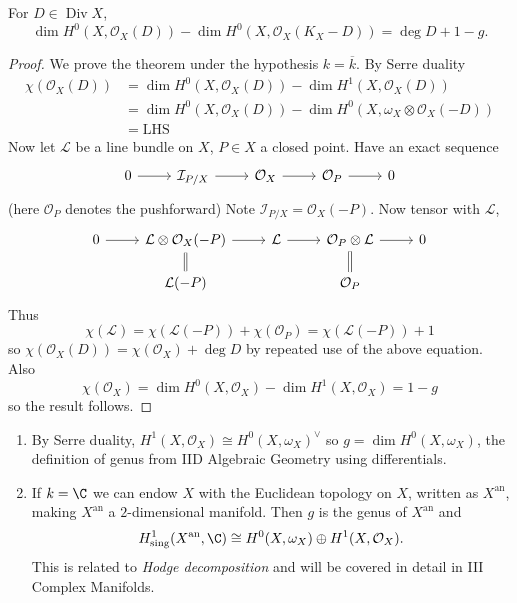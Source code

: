 \documentclass[a4paper]{article}
\newcommand{\sh}[1]{\mathcal{#1}} %
\DeclareMathOperator{\Div}{Div} %
\begin{document}
\begin{theorem}
  For \(D \in \Div X\),
  \[
    \dim H^0(X, \sh O_X(D)) - \dim H^0(X, \sh O_X(K_X - D)) = \deg D + 1 - g.
  \]
\end{theorem}

\begin{proof}
  We prove the theorem under the hypothesis \(k = \overline k\). By Serre duality
  \begin{align*}
    \chi(\sh O_X(D))
    &= \dim H^0(X, \sh O_X(D)) - \dim H^1(X, \sh O_X(D)) \\
    &= \dim H^0(X, \sh O_X(D)) - \dim H^0(X, \omega_X \otimes \sh O_X(-D)) \\
    &= \mathrm{LHS}
  \end{align*}
  Now let \(\sh L\) be a line bundle on \(X\), \(P \in X\) a closed point. Have an exact sequence
  \[
    \begin{tikzcd}
      0 \ar[r] & \sh I_{P/X} \ar[r] & \sh O_X \ar[r] & \sh O_P \ar[r] & 0
    \end{tikzcd}
  \]
  (here \(\sh O_P\) denotes the pushforward) Note \(\sh I_{P/X} = \sh O_X(-P)\). Now tensor with \(\sh L\),
  \[
    \begin{tikzcd}[row sep=scriptsize]
      0 \ar[r] & \sh L \otimes \sh O_X(-P) \ar[r] \ar[d, equal] & \sh L \ar[r] & \sh O_P \otimes \sh L \ar[r] \ar[d, equal] & 0 \\
      & \sh L(-P) & & \sh O_P
    \end{tikzcd}
  \]
  Thus
  \[
    \chi(\sh L) = \chi(\sh L(-P)) + \chi(\sh O_P) = \chi(\sh L(-P)) + 1
  \]
  so \(\chi(\sh O_X(D)) = \chi(\sh O_X) + \deg D\) by repeated use of the above equation. Also
  \[
    \chi(\sh O_X) = \dim H^0(X, \sh O_X) - \dim H^1(X, \sh O_X) = 1 - g
  \]
  so the result follows.
\end{proof}

\begin{remark}\leavevmode
  \begin{enumerate}
  \item By Serre duality, \(H^1(X, \sh O_X) \cong H^0(X, \omega_X)^\vee\) so \(g = \dim H^0(X, \omega_X)\), the definition of genus from IID Algebraic Geometry using differentials.
  \item If \(k = \C\) we can endow \(X\) with the Euclidean topology on \(X\), written as \(X^{\mathrm{an}}\), making \(X^{\mathrm{an}}\) a \(2\)-dimensional manifold. Then \(g\) is the genus of \(X^{\mathrm{an}}\) and
    \[
      H^1_{\mathrm{sing}}(X^{\mathrm{an}}, \C) \cong H^0(X, \omega_X) \oplus H^1(X, \sh O_X).
    \]
    This is related to \emph{Hodge decomposition} and will be covered in detail in III Complex Manifolds.
  \end{enumerate}
\end{remark}
\end{document}
